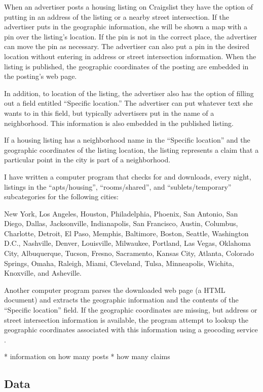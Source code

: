 \documentclass[12pt,letter]{article}\usepackage[]{graphicx}\usepackage[]{color}
\let\cite=\citep
\begin{document}
When an advertiser posts a housing listing on Craigslist they have the
option of putting in an address of the listing or a nearby street
intersection. If the advertiser puts in the geographic information,
she will be shown a map with a pin over the listing's location. If the
pin is not in the correct place, the advertiser can move the pin as
necessary. The advertiser can also put a pin in the desired location
without entering in address or street intersection information. When
the listing is published, the geographic coordinates of the posting
are embedded in the posting's web page.

In addition, to location of the listing, the advertiser also has the
option of filling out a field entitled ``Specific location.'' The
advertiser can put whatever text she wants to in this field, but
typically advertisers put in the name of a neighborhood. This
information is also embedded in the published listing.

If a housing listing has a neighborhood name in the ``Specific
location'' and the geographic coordinates of the listing location, the
listing represents a claim that a particular point in the city is part
of a neighborhood.

I have written a computer program that checks for and downloads, every
night, listings in the ``apts/housing'', ``rooms/shared'', and
``sublets/temporary'' subcategories for the following cities:

New York, Los Angeles, Houston, Philadelphia, Phoenix, San Antonio,
San Diego, Dallas, Jacksonville, Indianapolis, San Francisco, Austin,
Columbus, Charlotte, Detroit, El Paso, Memphis, Baltimore, Boston,
Seattle, Washington D.C., Nashville, Denver, Louisville, Milwaukee,
Portland, Las Vegas, Oklahoma City, Albuquerque, Tucson, Fresno,
Sacramento, Kansas City, Atlanta, Colorado Springs, Omaha, Raleigh,
Miami, Cleveland, Tulsa, Minneapolis, Wichita, Knoxville, and Asheville.

Another computer program parses the downloaded web page (a HTML
document) and extracts the geographic information and the contents of
the ``Specific location'' field. If the geographic coordinates are
missing, but address or street intersection information is available,
the program attempt to lookup the geographic coordinates associated with
this information using a geocoding service \cite{needed}. 

* information on how many posts
* how many claims


\subsection*{Data}
\end{document}
